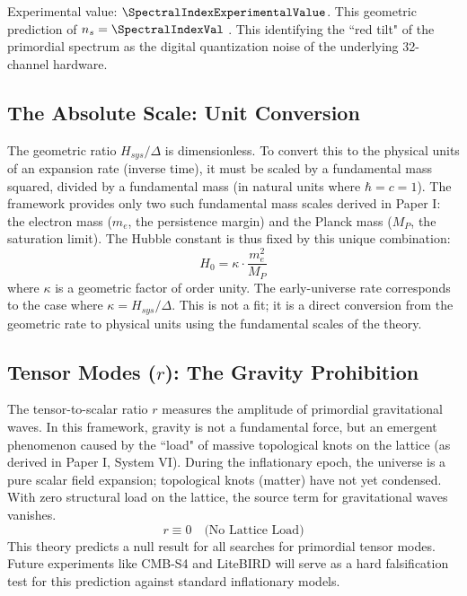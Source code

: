 Experimental value: $\SpectralIndexExperimentalValue$. This geometric prediction of $n_s = \SpectralIndexVal$ \SpectralIndexAccText.  This identifying the ``red tilt" of the primordial spectrum as the digital quantization noise of the underlying 32-channel hardware.


\subsection{The Absolute Scale: Unit Conversion}
The geometric ratio $H_{sys}/\Delta$ is dimensionless. To convert this to the physical units of an expansion rate (inverse time), it must be scaled by a fundamental mass squared, divided by a fundamental mass (in natural units where $\hbar=c=1$). The framework provides only two such fundamental mass scales derived in Paper I: the electron mass ($m_e$, the persistence margin) and the Planck mass ($M_P$, the saturation limit). The Hubble constant is thus fixed by this unique combination:
\begin{equation}
H_0 = \kappa \cdot \frac{m_e^2}{M_P}
\end{equation}
where $\kappa$ is a geometric factor of order unity. The early-universe rate corresponds to the case where $\kappa = H_{sys}/\Delta$. This is not a fit; it is a direct conversion from the geometric rate to physical units using the fundamental scales of the theory.


\subsection{Tensor Modes (\texorpdfstring{$r$}{r}): The Gravity Prohibition}
The tensor-to-scalar ratio $r$ measures the amplitude of primordial gravitational waves. In this framework, gravity is not a fundamental force, but an emergent phenomenon caused by the ``load" of massive topological knots on the lattice (as derived in Paper I, System VI). During the inflationary epoch, the universe is a pure scalar field expansion; topological knots (matter) have not yet condensed. With zero structural load on the lattice, the source term for gravitational waves vanishes.
\begin{equation}
r \equiv 0 \quad \text{(No Lattice Load)}
\end{equation}
This theory predicts a null result for all searches for primordial tensor modes. Future experiments like CMB-S4 and LiteBIRD will serve as a hard falsification test for this prediction against standard inflationary models.

